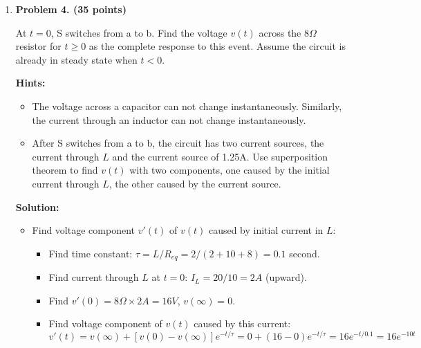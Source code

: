 \begin{enumerate}
{\bf Solution:} Represent $v_0(t)$ and $i_0(t)$ as phasors:
\[ \dot{V}_0=10\angle 0^\circ V,\;\;\;\;\; \dot{I}_0=2 \angle 45^\circ A \]
Use superposition:
\begin{itemize}
\item Due to voltage source along with current source open,
\[ \dot{I}'=\frac{\dot{V}_0}{j2/3+j2||(-j0.5)+5}
           =\frac{10\angle 0^\circ}{j2/3-j2/3+5}=2\angle 0^\circ \; A \]
\[ i'(t)=2\sqrt{2} \cos 2t \; A \]
\item Due to current source along with voltage source shorted, 
\[ \dot{I}''=\dot{I}_0 \frac{j1+j3||(-j1/3)}{5+j1+j3||(-j1/3)}
   =2\angle 45^\circ \; \frac{j5/8}{5+j5/8}=0.25\angle 127.87^\circ \;A
\]
\[ i''(t)=0.25\sqrt{2} \cos(3t+127.87^\circ) \; A \]
\end{itemize}
The current $i(t)$ is therefore
\[ i(t)=i'(t)+i''(t)=2\sqrt{2} \cos 2t+0.25\sqrt{2} \cos(3t+127.87^\circ) \; A \]

\item {\bf Problem 4. (35 points)}

At $t=0$, S switches from a to b. Find the voltage $v(t)$ across the $8\Omega$ 
resistor for $t \ge 0$ as the complete response to this event. Assume the 
circuit is already in steady state when $t<0$.


{\bf Hints:}
\begin{itemize}
\item The voltage across a capacitor can not change instantaneously. 
  Similarly, the current through an inductor can not change instantaneously.
\item After S switches from a to b, the circuit has two current sources, the
  current through $L$ and the current source of 1.25A. Use superposition 
  theorem to find $v(t)$ with two components, one caused by the initial 
  current through $L$, the other caused by the current source.
\end{itemize}

{\bf Solution:} 
\begin{itemize}
\item Find voltage component $v'(t)$ of $v(t)$ caused by initial current in $L$:
  \begin{itemize}
  \item Find time constant: $\tau=L/R_{eq}=2/(2+10+8)=0.1$ second.
  \item Find current through $L$ at $t=0$: $I_L=20/10=2A$ (upward).
  \item Find $v'(0)=8\Omega \times 2A=16V$, $v(\infty)=0$.
  \item Find voltage component of $v(t)$ caused by this current:
  \[ v'(t)=v(\infty)+[v(0)-v(\infty)]e^{-t/\tau}=
  0+(16-0) e^{-t/\tau}=16 e^{-t/0.1}=16 e^{-10t} \]
\end{itemize}


\end{itemize}
\end{enumerate}
